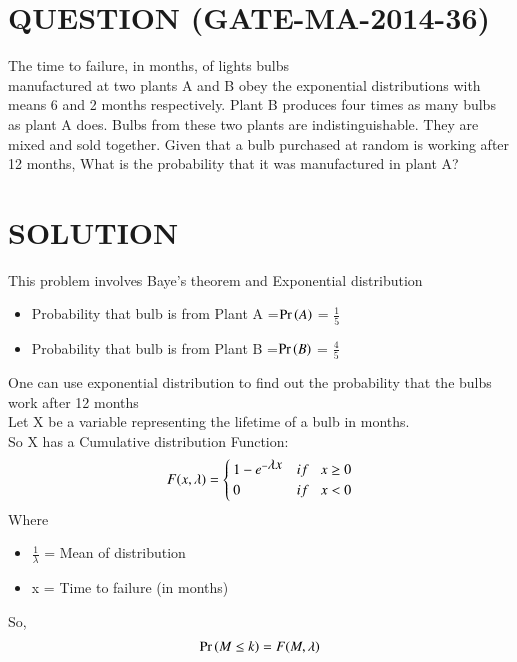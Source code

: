 \documentclass[journal,12pt,twocolumn]{IEEEtran}
\begin{document}
\section*{QUESTION (GATE-MA-2014-36)}
The time to failure, in months, of lights bulbs \\manufactured at two plants A and B
obey the exponential distributions with means 6 and 2 months respectively. Plant B produces
four times as many bulbs as plant A does. Bulbs from these two plants are indistinguishable.
They are mixed and sold together. Given that a bulb purchased at random is working after 12 months, What is the probability that it was manufactured in plant A?
\section*{SOLUTION}
This problem involves Baye's theorem and \newline Exponential distribution
\bigskip
\begin{itemize}
    \item Probability that bulb is from Plant A =\newline $\Pr\left(A\right)$ = \(\frac{1}{5}\)
    \item Probability that bulb is from Plant B =\newline$\Pr\left(B\right)$ = \( \frac{4}{5} \)
\end{itemize}
\bigskip
One can use exponential distribution to find out the probability that the bulbs work after 12 months\\
Let X be a variable representing the lifetime of a bulb in months.\\
So X has a Cumulative distribution Function:
\begin{equation}
    F(x,\lambda) =
    \begin{cases}
        1 - {e}^{-\displaystyle\lambda x} & if \hspace{0.3cm}x \geq 0\\
        0       & if \hspace{0.3cm}x < 0
    \end{cases}
\end{equation}
Where
\begin{itemize}
    \item $\frac{1}{\displaystyle\lambda}$ = Mean of distribution
    \newline
    \item x = Time to failure (in months)
\end{itemize}
\bigskip
So,
\begin{align}
    \Pr\left(M\leq k\right) = F(M,\lambda)\label{0.0.2}
\end{align}
\end{document}
